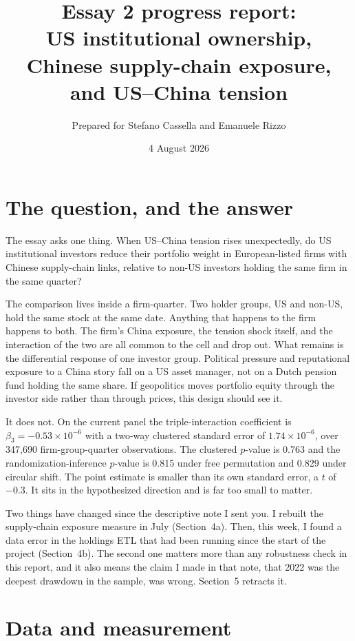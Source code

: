 \documentclass[11pt]{article}
\title{Essay 2 progress report:\\
US institutional ownership, Chinese supply-chain exposure,\\
and US--China tension}
\author{Prepared for Stefano Cassella and Emanuele Rizzo}
\date{4 August 2026}
\begin{document}
\maketitle

\section{The question, and the answer}

The essay asks one thing. When US--China tension rises unexpectedly, do
US institutional investors reduce their portfolio weight in European-listed
firms with Chinese supply-chain links, relative to non-US investors holding
the same firm in the same quarter?

The comparison lives inside a firm-quarter. Two
holder groups, US and non-US, hold the same stock at the same date. Anything
that happens to the firm happens to both. The firm's China exposure, the
tension shock itself, and the interaction of the two are all common to the
cell and drop out. What remains is the differential response of one investor
group. Political pressure and reputational exposure to a China story fall on a
US asset manager, not on a Dutch pension fund holding the same share. If geopolitics moves portfolio equity through the
investor side rather than through prices, this design should see it.

It does not. On the current panel the triple-interaction coefficient is
$\beta_3 = -0.53 \times 10^{-6}$ with a two-way clustered standard error of
$1.74 \times 10^{-6}$, over 347,690 firm-group-quarter observations. The
clustered $p$-value is 0.763 and the randomization-inference $p$-value is
0.815 under free permutation and 0.829 under circular shift. The point estimate
is smaller than its own standard error, a $t$ of $-0.3$. It sits in the
hypothesized direction and is far too small to matter.

Two things have changed since the descriptive note I sent you. I rebuilt the
supply-chain exposure measure in July (Section~4a). Then, this week, I found a
data error in the holdings ETL that had been running since the start of the
project (Section~4b). The second one matters more than any robustness check in
this report, and it also means the claim I made in that note, that 2022 was the
deepest drawdown in the sample, was wrong. Section~5 retracts it.

\section{Data and measurement}
\end{document}
